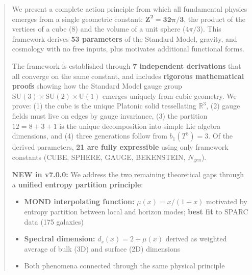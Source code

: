\documentclass[11pt,a4paper]{article}
\theoremstyle{plain}
\theoremstyle{definition}
\theoremstyle{remark}
\newcommand{\Ngen}{N_{\text{gen}}}
\newcommand{\SUthree}{\text{SU}(3)}
\newcommand{\SUtwo}{\text{SU}(2)}
\newcommand{\Uone}{\text{U}(1)}
\begin{document}
\begin{abstract}
We present a complete action principle from which all fundamental physics emerges from a single geometric constant: $\mathbf{Z^2 = 32\pi/3}$, the product of the vertices of a cube (8) and the volume of a unit sphere ($4\pi/3$). This framework derives \textbf{53 parameters} of the Standard Model, gravity, and cosmology with no free inputs, plus motivates additional functional forms.

The framework is established through \textbf{7 independent derivations} that all converge on the same constant, and includes \textbf{rigorous mathematical proofs} showing how the Standard Model gauge group $\SUthree \times \SUtwo \times \Uone$ emerges uniquely from cubic geometry. We prove: (1) the cube is the unique Platonic solid tessellating $\mathbb{R}^3$, (2) gauge fields must live on edges by gauge invariance, (3) the partition $12 = 8 + 3 + 1$ is the unique decomposition into simple Lie algebra dimensions, and (4) three generations follow from $b_1(T^3) = 3$. Of the derived parameters, \textbf{21 are fully expressible} using only framework constants (CUBE, SPHERE, GAUGE, BEKENSTEIN, $\Ngen$).

\textbf{\textcolor{newcolor}{NEW in v7.0.0:}} We address the two remaining theoretical gaps through a \textbf{unified entropy partition principle}:
\begin{itemize}[nosep]
  \item \textbf{MOND interpolating function:} $\mu(x) = x/(1+x)$ motivated by entropy partition between local and horizon modes; \textbf{best fit} to SPARC data (175 galaxies)
  \item \textbf{Spectral dimension:} $d_s(x) = 2 + \mu(x)$ derived as weighted average of bulk (3D) and surface (2D) dimensions
  \item Both phenomena connected through the same physical principle
\end{itemize}


\end{abstract}
\end{document}
